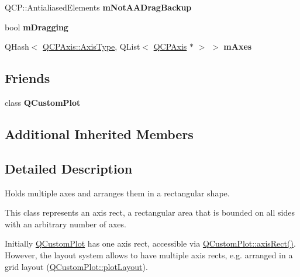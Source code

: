 \begin{DoxyCompactItemize}
\item 
Q\+C\+P\+::\+Antialiased\+Elements {\bfseries m\+Not\+A\+A\+Drag\+Backup}\hypertarget{classQCPAxisRect_a6fcb12e052e276d57efbb128be31d6f5}{}\label{classQCPAxisRect_a6fcb12e052e276d57efbb128be31d6f5}

\item 
bool {\bfseries m\+Dragging}\hypertarget{classQCPAxisRect_ab49a6698194cf0e9e38a1d734c0888a8}{}\label{classQCPAxisRect_ab49a6698194cf0e9e38a1d734c0888a8}

\item 
Q\+Hash$<$ \hyperlink{classQCPAxis_ae2bcc1728b382f10f064612b368bc18a}{Q\+C\+P\+Axis\+::\+Axis\+Type}, Q\+List$<$ \hyperlink{classQCPAxis}{Q\+C\+P\+Axis} $\ast$ $>$ $>$ {\bfseries m\+Axes}\hypertarget{classQCPAxisRect_afe7a24d2a2bea98fc552fa826350ba81}{}\label{classQCPAxisRect_afe7a24d2a2bea98fc552fa826350ba81}

\end{DoxyCompactItemize}
\subsection*{Friends}
\begin{DoxyCompactItemize}
\item 
class {\bfseries Q\+Custom\+Plot}\hypertarget{classQCPAxisRect_a1cdf9df76adcfae45261690aa0ca2198}{}\label{classQCPAxisRect_a1cdf9df76adcfae45261690aa0ca2198}

\end{DoxyCompactItemize}
\subsection*{Additional Inherited Members}


\subsection{Detailed Description}
Holds multiple axes and arranges them in a rectangular shape. 

This class represents an axis rect, a rectangular area that is bounded on all sides with an arbitrary number of axes.

Initially \hyperlink{classQCustomPlot}{Q\+Custom\+Plot} has one axis rect, accessible via \hyperlink{classQCustomPlot_a4a37a1add5fe63060ac518cf0a4c4050}{Q\+Custom\+Plot\+::axis\+Rect()}. However, the layout system allows to have multiple axis rects, e.\+g. arranged in a grid layout (\hyperlink{classQCustomPlot_afd280d4d621ae64a106543a545c508d7}{Q\+Custom\+Plot\+::plot\+Layout}).

